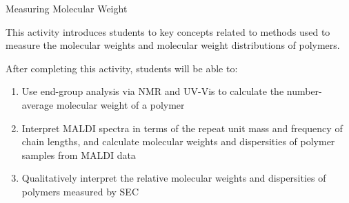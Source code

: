 %
%
%
%

\renewcommand{\figpath}{content/intro/measuring-MW/figs}
\renewcommand{\labelbase}{measuring-MW}

\begin{activity}{Measuring Molecular Weight}
\label{\labelbase}

\begin{instructornotes}

	This activity introduces students to key concepts related to methods used to measure the molecular weights and molecular weight distributions of polymers.
	
	After completing this activity, students will be able to:
			\begin{enumerate}
				\item Use end-group analysis via NMR and UV-Vis to calculate the number-average molecular weight of a polymer
				\item Interpret MALDI spectra in terms of the repeat unit mass and frequency of chain lengths, and calculate molecular weights and dispersities of polymer samples from MALDI data
				\item Qualitatively interpret the relative molecular weights and dispersities of polymers measured by SEC
			\end{enumerate}
			

\end{instructornotes}
\end{activity}
